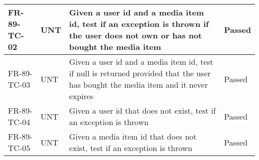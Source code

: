 \documentclass[../report.tex]{subfiles}
\begin{document}
\begin{longtable}{|L{2.1cm}|L{1cm}|L{12.4cm}|L{1.4cm}|}
FR-89-TC-02&UNT&Given a user id and a media item id, test if an exception is thrown if the user does not own or has not bought the media item&Passed  \\ \hline
FR-89-TC-03&UNT&Given a user id and a media item id, test if null is returned provided that the user has bought the media item and it never expires&Passed  \\ \hline
FR-89-TC-04&UNT&Given a user id that does not exist, test if an exception is thrown&Passed  \\ \hline
FR-89-TC-05&UNT&Given a media item id that does not exist, test if an exception is thrown&Passed  \\ \hline

\end{longtable}

\label{testmatrix}
\end{document}
